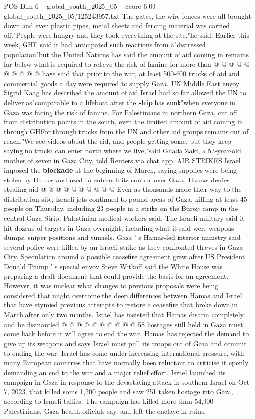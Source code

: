 \begin{textsample}{POS Dim 6 – global\_south\_2025\_05 – Score 6.00 – global\_south\_2025\_05/125243957.txt}
The gates, the wire fences were all brought down and even plastic pipes, metal sheets and fencing material was carried off."People were hungry and they took everything at the site,"he said.
Earlier this week, GHF said it had anticipated such reactions from a"distressed population"but the United Nations has said the amount of aid coming in remains far below what is required to relieve the risk of famine for more than @ @ @ @ @ @ @ @ @ @ have said that prior to the war, at least 500-600 trucks of aid and commercial goods a day were required to supply Gaza.
UN Middle East envoy Sigrid Kaag has described the amount of aid Israel had so far allowed the UN to deliver as"comparable to a lifeboat after the \textbf{ship} has sunk"when everyone in Gaza was facing the risk of famine.
For Palestinians in northern Gaza, cut off from distribution points in the south, even the limited amount of aid coming in through GHFor through trucks from the UN and other aid groups remains out of reach."We see videos about the aid, and people getting some, but they keep saying no trucks can enter north where we live,"said Ghada Zaki, a 52-year-old mother of seven in Gaza City, told Reuters via chat app.
AIR STRIKES Israel imposed the \textbf{blockade} at the beginning of March, saying supplies were being stolen by Hamas and used to entrench its control over Gaza.
Hamas denies stealing aid @ @ @ @ @ @ @ @ @ @ Even as thousands made their way to the distribution site, Israeli jets continued to pound areas of Gaza, killing at least 45 people on Thursday, including 23 people in a strike on the Bureij camp in the central Gaza Strip, Palestinian medical workers said.
The Israeli military said it hit dozens of targets in Gaza overnight, including what it said were weapons dumps, sniper positions and tunnels.
Gaza ' s Hamas-led interior ministry said several police were killed by an Israeli strike as they confronted thieves in Gaza City.
Speculation around a possible ceasefire agreement grew after US President Donald Trump ' s special envoy Steve Witkoff said the White House was preparing a draft document that could provide the basis for an agreement.
However, it was unclear what changes to previous proposals were being considered that might overcome the deep differences between Hamas and Israel that have stymied previous attempts to restore a ceasefire that broke down in March after only two months.
Israel has insisted that Hamas disarm completely and be dismantled @ @ @ @ @ @ @ @ @ @ 58 hostages still held in Gaza must come back before it will agree to end the war.
Hamas has rejected the demand to give up its weapons and says Israel must pull its troops out of Gaza and commit to ending the war.
Israel has come under increasing international pressure, with many European countries that have normally been reluctant to criticise it openly demanding an end to the war and a major relief effort.
Israel launched its campaign in Gaza in response to the devastating attack in southern Israel on Oct 7, 2023, that killed some 1,200 people and saw 251 taken hostage into Gaza, according to Israeli tallies.
The campaign has killed more than 54,000 Palestinians, Gaza health officials say, and left the enclave in ruins.


\end{textsample}

